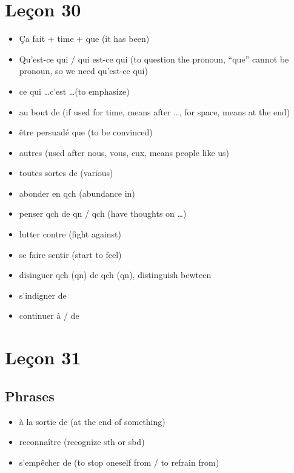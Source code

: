 \documentclass{book}
\begin{document}
\chapter{Leçon 30}
    \begin{itemize}
        \item Ça fait + time + que (it has been)
        \item Qu'est-ce qui / qui est-ce qui (to question the pronoun, ``que'' cannot be pronoun, so we need qu'est-ce qui)
        \item ce qui \dots c'est \dots (to emphasize)
        \item au bout de (if used for time, means after \dots, for space, means at the end)
        \item être persuadé que (to be convinced)
        \item autres (used after nous, vous, eux, means people like us)
        \item toutes sortes de (various)
        \item abonder en qch (abundance in)
        \item penser qch de qn / qch (have thoughts on \dots)
        \item lutter contre (fight against)
        \item se faire sentir (start to feel)
        \item disinguer qch (qn) de qch (qn), distinguish bewteen
        \item s'indigner de
        \item continuer à / de
    \end{itemize}

\chapter{Leçon 31}

    \section{Phrases}
        \begin{itemize}
            \item à la sortie de (at the end of something)
            \item reconnaître (recognize sth or sbd)
            \item s'empêcher de (to stop oneself from / to refrain from)
        \end{itemize}
\end{document}
